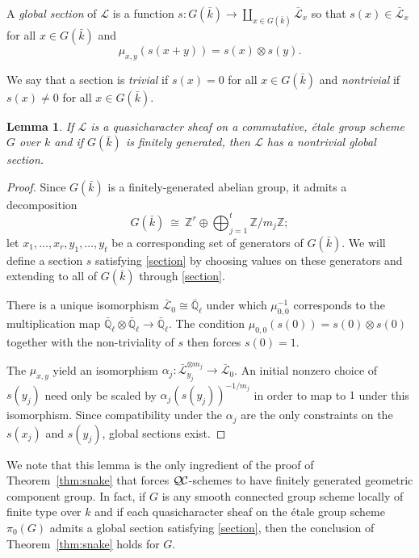 \documentclass[11pt]{amsart}
\theoremstyle{plain}
\newtheorem{lemma}[theorem]{Lemma}
\theoremstyle{definition}
\theoremstyle{remark}
\newcommand{\ZZ}{{\mathbb{Z}}}
\newcommand{\EE}{\mathbb{\bar Q}_\ell}
\newcommand{\bFq}{\bar{k}}
\newcommand{\Fq}{k}
\newcommand{\iso}{{\ \cong\ }}
\newcommand{\qcs}[1]{{\mathcal{#1}}}
\newcommand{\gqcs}[1]{{\mathcal{\bar #1}}}
\newcommand{\QC}{{\mathcal{Q\hskip-0.8pt C}}}
\newcommand\Clifton[1]{\marginpar{\smaller\smaller CC: #1}}
\begin{document}
A \emph{global section} of $\qcs{L}$ is a function $s : G(\bFq) \to \coprod_{x \in G(\bFq)} \gqcs{L}_x$ so that $s(x) \in \gqcs{L}_x$ for all $x \in G(\bFq)$ and
\begin{equation}\label{section}
\mu_{x,y}(s(x+y)) = s(x) \otimes s(y).
\end{equation}

We say that a section is \emph{trivial} if $s(x) = 0$ for all $x \in G(\bFq)$ and \emph{nontrivial} if $s(x) \ne 0$ for all $x \in G(\bFq)$.

\begin{lemma}\label{lemma:section}
 If $\qcs{L}$ is a quasicharacter sheaf on a commutative, \'etale group scheme $G$
 \Clifton{Use: Etale $\QC$-schemes?}
 over $\Fq$ and if $G(\bFq)$ is finitely generated, then $\qcs{L}$ has a nontrivial global section.
\end{lemma}

\begin{proof}
  Since $G(\bFq)$ is a finitely-generated abelian group, it admits a decomposition
  \[
  G(\bFq) \iso \ZZ^r \oplus \bigoplus_{j=1}^t \ZZ / m_j \ZZ;
  \]
  let $x_1, \ldots, x_r, y_1, \ldots, y_t$ be a corresponding set of generators of $G(\bFq)$.
  We will define a section $s$ satisfying \eqref{section} by choosing values on these generators and extending to all
  of $G(\bFq)$ through \eqref{section}.
  
  There is a unique isomorphism $\gqcs{L}_0 \cong \EE$ under which $\mu_{0,0}^{-1}$ corresponds
  to the multiplication map $\EE \otimes\EE \to \EE$.
  The condition $\mu_{0,0}(s(0)) = s(0) \otimes s(0)$ together with the non-triviality of $s$
  then forces $s(0) = 1$.
  
  The $\mu_{x,y}$ yield an isomorphism $\alpha_j : \gqcs{L}_{y_j}^{\otimes m_j} \to \gqcs{L}_0$.
  An initial nonzero choice of $s(y_j)$ need only be scaled by $\alpha_j(s(y_j))^{-1/m_j}$ in order to map to
  $1$ under this isomorphism.  Since compatibility under the $\alpha_j$ are the only constraints on the
  $s(x_j)$ and $s(y_j)$, global sections exist.
\end{proof}

We note that this lemma is the only ingredient of the proof of Theorem~\ref{thm:snake}
that forces $\QC$-schemes to have finitely generated geometric component group.  In fact,
if $G$ is any smooth connected group scheme locally of finite type over $\Fq$
and if each quasicharacter sheaf on the \'etale group scheme $\pi_0(G)$ admits a global section 
satisfying \eqref{section}, then the conclusion of Theorem~\ref{thm:snake} holds for $G$.
\end{document}
